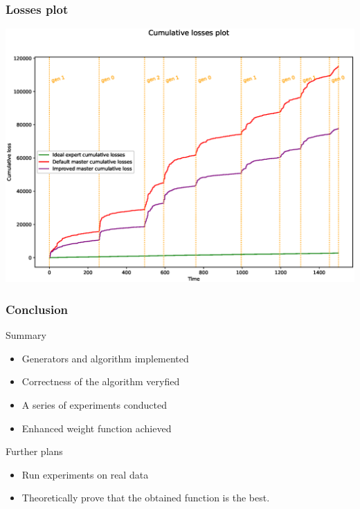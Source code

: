 \documentclass{beamer}
\begin{document}

\begin{frame}
\frametitle{Losses plot}
\includegraphics[width=1\linewidth]{improvement3}

\end{frame}


\begin{frame}
\frametitle{Conclusion}

\begin{block}
    
    Summary
        
    \begin{itemize}
  
        \item Generators and algorithm implemented
        \item Correctness of the algorithm veryfied
        \item A series of experiments conducted
        \item Enhanced weight function achieved
                
    \end{itemize}
    \end{block}    
    
    \begin{block}
    
    Further plans
    
    \begin{itemize}
    
        \item Run experiments on real data 
        \item Theoretically prove that the obtained function is the best.              
    \end{itemize}
    \end{block}

    
\end{frame}
\end{document}
